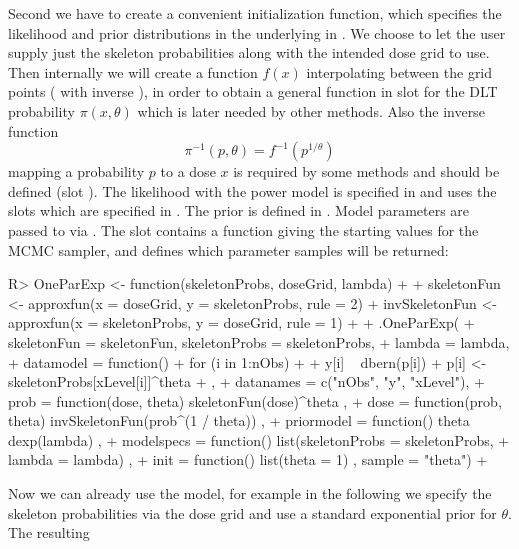 \documentclass[article]{jss}\usepackage[]{graphicx}\usepackage[]{color}
\begin{document}
Second we have to create a convenient initialization function, which specifies
the likelihood and prior distributions in the underlying  in .
We choose to let the user supply just the skeleton probabilities along with the
intended dose grid to use. Then internally we will create a function $f(x)$ 
interpolating between the grid points ( with inverse ), in order to obtain a general  function
in slot  for the DLT probability $\pi(x, \theta)$ which is later needed by other methods. Also the inverse function 
\begin{equation}
\label{eq:oneparameterInverse}
\pi^{-1}(p, \theta) = f^{-1}(p^{1/\theta})
\end{equation}
mapping a probability $p$ to a dose $x$ is required by some methods and 
should be defined (slot ). The likelihood with the power model 
is specified in 
and uses the  slots which are specified in . The prior is 
defined in . Model parameters are passed to  via . The  slot contains a function giving the starting values for the MCMC sampler,
and  defines which parameter samples will be returned:
\begin{Schunk}
\begin{Sinput}
R> OneParExp <- function(skeletonProbs, doseGrid, lambda)
+  {
+    skeletonFun <- approxfun(x = doseGrid, y = skeletonProbs, rule = 2)
+    invSkeletonFun <- approxfun(x = skeletonProbs, y = doseGrid, rule = 1)
+    
+    .OneParExp(
+      skeletonFun = skeletonFun, skeletonProbs = skeletonProbs, 
+      lambda = lambda,
+      datamodel = function(){
+        for (i in 1:nObs)
+        {
+          y[i] ~ dbern(p[i])
+          p[i] <- skeletonProbs[xLevel[i]]^theta
+        }},
+      datanames = c("nObs", "y", "xLevel"),
+      prob = function(dose, theta){ skeletonFun(dose)^theta },
+      dose = function(prob, theta){ invSkeletonFun(prob^(1 / theta)) },
+      priormodel = function(){ theta ~ dexp(lambda) },
+      modelspecs = function(){ list(skeletonProbs = skeletonProbs,
+                                    lambda = lambda) },
+      init = function(){ list(theta = 1) }, sample = "theta")
+  }
\end{Sinput}
\end{Schunk}
Now we can already use the model, for example in the following we specify the skeleton probabilities via the dose grid and use a standard exponential prior for $\theta$. The resulting
\end{document}
